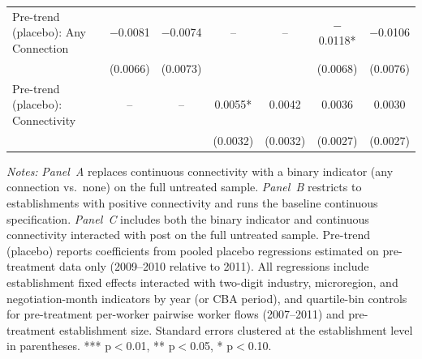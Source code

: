 \documentclass[12pt,letterpaper]{article}
\begin{document}
\begin{table}[]
\begin{tabular}{lcccccc}
\midrule
Pre-trend (placebo): Any Connection & $-$0.0081 & $-$0.0074 & -- & -- & $-$0.0118* & $-$0.0106 \\
  & (0.0066) & (0.0073) & &  & (0.0068) & (0.0076) \\
Pre-trend (placebo): Connectivity & -- & -- & 0.0055* & 0.0042 & 0.0036 & 0.0030 \\
  & &  & (0.0032) & (0.0032) & (0.0027) & (0.0027) \\
\bottomrule\bottomrule
\end{tabular}
\begin{minipage}{\linewidth}
\footnotesize\vspace{4pt}
\textit{Notes:} \textit{Panel~A} replaces continuous connectivity with a binary indicator (any connection vs.\ none) on the full untreated sample. \textit{Panel~B} restricts to establishments with positive connectivity and runs the baseline continuous specification. \textit{Panel~C} includes both the binary indicator and continuous connectivity interacted with post on the full untreated sample. Pre-trend (placebo) reports coefficients from pooled placebo regressions estimated on pre-treatment data only (2009--2010 relative to 2011). All regressions include establishment fixed effects interacted with two-digit industry, microregion, and negotiation-month indicators by year (or CBA period), and quartile-bin controls for pre-treatment per-worker pairwise worker flows (2007--2011) and pre-treatment establishment size. Standard errors clustered at the establishment level in parentheses. *** p$<$0.01, ** p$<$0.05, * p$<$0.10.
\end{minipage}
\end{table}

\clearpage
\end{document}
